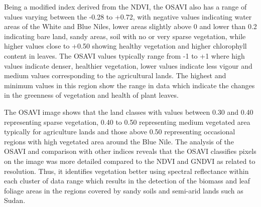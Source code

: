 \documentclass[jimaging,article,submit,pdftex,moreauthors]{Definitions/mdpi}
\begin{document}
Being a modified index derived from the NDVI, the OSAVI also has a range of values varying between the -0.28 to +0.72, with negative values indicating water areas of the White and Blue Niles, lower areas slightly above 0 and lower than 0.2 indicating bare land, sandy areas, soil with no or very sparse vegetation, while higher values close to +0.50 showing healthy vegetation and higher chlorophyll content in leaves. The OSAVI values typically range from -1 to +1 where high values indicate denser, healthier vegetation, lower values indicate less vigour and medium values corresponding to the agricultural lands. The highest and minimum values in this region show the range in data which indicate the changes in the greenness of vegetation and health of plant leaves.

The OSAVI image shows that the land classes with values between 0.30 and 0.40 representing sparse vegetation, 0.40 to 0.50 representing medium vegetated area typically for agriculture lands and those above 0.50 representing occasional regions with high vegetated area around the Blue Nile. The analysis of the OSAVI and comparison with other indices reveals that the OSAVI classifies pixels on the image was more detailed compared to the NDVI and GNDVI as related to resolution. Thus, it identifies vegetation better using spectral reflectance within each cluster of data range which results in the detection of the biomass and leaf foliage areas in the regions covered by sandy soils and semi-arid lands such as Sudan. 
\end{document}
